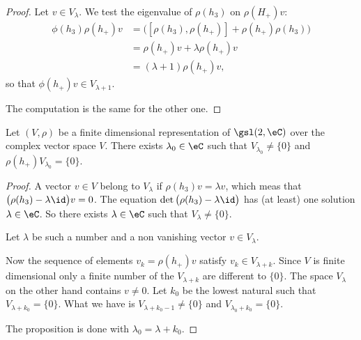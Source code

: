 \begin{proof}
    Let \( v\in V_{\lambda}\). We test the eigenvalue of \( \rho(h_3)\) on \( \rho(H_+)v\):
    \begin{subequations}
        \begin{align}
            \phi(h_3)\rho(h_+)v&=\big( [\rho(h_3),\rho(h_+)]+\rho(h_+)\rho(h_3) \big)\\
            &=\rho(h_+)v+\lambda\rho(h_+)v\\
            &=(\lambda+1)\rho(h_+)v,
        \end{align}
    \end{subequations}
    so that \( \phi(h_+)v\in V_{\lambda+1}\).

    The computation is the same for the other one.
\end{proof}

\begin{lemma}           \label{LEMooWXDYooUyijnm}
    Let \( (V,\rho)\) be a finite dimensional representation of \( \gsl(2,\eC)\) over the complex vector space \( V\). There exists \( \lambda_0\in \eC\) such that \( V_{\lambda_0}\neq \{ 0 \}\) and \( \rho(h_+)V_{\lambda_0}=\{ 0 \}\).
\end{lemma}

\begin{proof}
    A vector \( v\in V\) belong to \( V_{\lambda}\) if \( \rho(h_3)v=\lambda v\), which meas that \( \big( \rho(h_3)-\lambda\id \big)v=0\). The equation \( \det\big( \rho(h_3)-\lambda\id \big)\) has (at least) one solution \( \lambda\in \eC\). So there exists \( \lambda\in \eC\) such that \( V_{\lambda}\neq \{ 0 \}\). 
    
    Let \( \lambda\) be such a number and a non vanishing vector \( v\in V_{\lambda}\).

    Now the sequence of elements \( v_k= \rho(h_+)v   \) satisfy \( v_k\in V_{\lambda+k}\). Since \( V\) is finite dimensional only a finite number of the \( V_{\lambda+k}\) are different to \( \{ 0 \}\). The space \( V_{\lambda}\) on the other hand contains \( v\neq 0\). Let \( k_0\) be the lowest natural such that \( V_{\lambda+k_0}=\{ 0 \}\). What we have is \( V_{\lambda+k_0-1}\neq \{ 0 \}\) and \( V_{\lambda_0+k_0}=\{ 0 \}\).

    The proposition is done with \( \lambda_0=\lambda+k_0\).
\end{proof}

